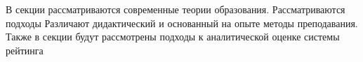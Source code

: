 В секции рассматриваются современные теории образования. Рассматриваются подходы
Различают дидактический и основанный на опыте методы преподавания.
Также в секции будут рассмотрены подходы к аналитической оценке системы рейтинга